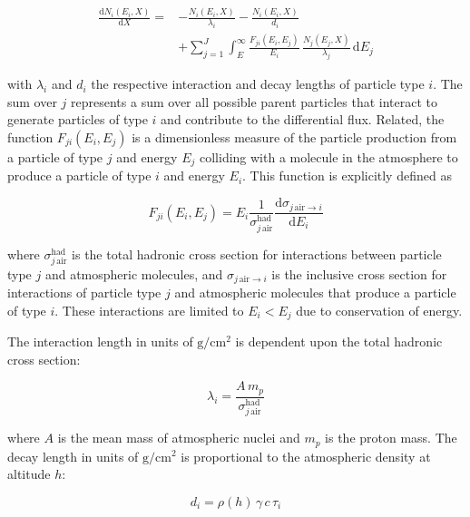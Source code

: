 \begin{align}
    \frac{\text{d}N_{i}\left(E_{i}, X\right)}{\text{d}X} = & -\frac{N_{i}\left(E_{i}, X\right)}{\lambda_{i}} - \frac{N_{i}\left(E_{i}, X\right)}{d_{i}} \nonumber\\
    & + \sum_{j=1}^{J} \int_{E}^{\infty} \frac{F_{ji}\left(E_{i}, E_{j}\right)}{E_{i}} \, \frac{N_{j}\left(E_{j}, X\right)}{\lambda_{j}} \, \text{d}E_{j} \label{eq:cascade}
\end{align}

\noindent
with $\lambda_{i}$ and $d_{i}$ the respective interaction and decay lengths of particle type $i$.
The sum over $j$ represents a sum over all possible parent particles that interact to generate particles of type $i$ and contribute to the differential flux.
Related, the function $F_{ji}\left(E_{i}, E_{j}\right)$ is a dimensionless measure of the particle production from a particle of type $j$ and energy $E_{j}$ colliding with a molecule in the atmosphere to produce a particle of type $i$ and energy $E_{i}$.
This function is explicitly defined as

\begin{equation}
    F_{ji}\left(E_{i}, E_{j}\right) = E_{i} \frac{1}{\sigma_{j\,\text{air}}^{\text{had}}} \frac{\text{d}\sigma_{j\,\text{air}\rightarrow i}}{\text{d}E_{i}} \label{eq:particle_yield}
\end{equation}

\noindent
where $\sigma_{j\,\text{air}}^{\text{had}}$ is the total hadronic cross section for interactions between particle type $j$ and atmospheric molecules, and $\sigma_{j\,\text{air}\rightarrow i}$ is the inclusive cross section for interactions of particle type $j$ and atmospheric molecules that produce a particle of type $i$.
These interactions are limited to $E_{i}<E_{j}$ due to conservation of energy.

The interaction length in units of $\text{g}/\text{cm}^{2}$ is dependent upon the total hadronic cross section:

\begin{equation}
    \lambda_{i} = \frac{A\,m_{p}}{\sigma_{j\,\text{air}}^{\text{had}}} \label{eq:interaction_length}
\end{equation}

\noindent
where $A$ is the mean mass of atmospheric nuclei and $m_{p}$ is the proton mass.
The decay length in units of $\text{g}/\text{cm}^{2}$ is proportional to the atmospheric density at altitude $h$:

\begin{equation}
    d_{i} = \rho(h)\,\gamma\,c\,\tau_{i} \label{eq:decay_length}
\end{equation}

